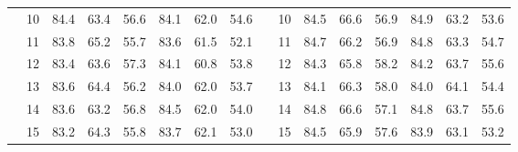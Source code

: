 \begin{table}[p]
{\begin{tabular}{c c | c c c | c c c || c c | c c c | c c c}
             & 10 & 84.4 & 63.4 & 56.6 & 84.1 & 62.0 & 54.6 &  & 10 & 84.5 & 66.6 & 56.9 & 84.9 & 63.2 & 53.6 \\
             & 11 & 83.8 & 65.2 & 55.7 & 83.6 & 61.5 & 52.1 &  & 11 & 84.7 & 66.2 & 56.9 & 84.8 & 63.3 & 54.7 \\
             & 12 & 83.4 & 63.6 & 57.3 & 84.1 & 60.8 & 53.8 &  & 12 & 84.3 & 65.8 & 58.2 & 84.2 & 63.7 & 55.6 \\
             & 13 & 83.6 & 64.4 & 56.2 & 84.0 & 62.0 & 53.7 &  & 13 & 84.1 & 66.3 & 58.0 & 84.0 & 64.1 & 54.4 \\
             & 14 & 83.6 & 63.2 & 56.8 & 84.5 & 62.0 & 54.0 &  & 14 & 84.8 & 66.6 & 57.1 & 84.8 & 63.7 & 55.6 \\
             & 15 & 83.2 & 64.3 & 55.8 & 83.7 & 62.1 & 53.0 &  & 15 & 84.5 & 65.9 & 57.6 & 83.9 & 63.1 & 53.2 \\
    \bottomrule
\end{tabular}%
}
\label{tab:duration_distal_plain}
\end{table}

